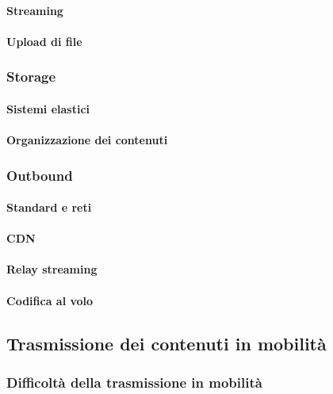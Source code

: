          \paragraph{Streaming}

         \paragraph{Upload di file}

      \subsubsection{Storage}
         \paragraph{Sistemi elastici}

         \paragraph{Organizzazione dei contenuti}

      \subsubsection{Outbound}
         \paragraph{Standard e reti}

         \paragraph{CDN}

         \paragraph{Relay streaming}

         \paragraph{Codifica al volo}

   \subsection{Trasmissione dei contenuti in mobilità}
      \subsubsection{Difficoltà della trasmissione in mobilità}

